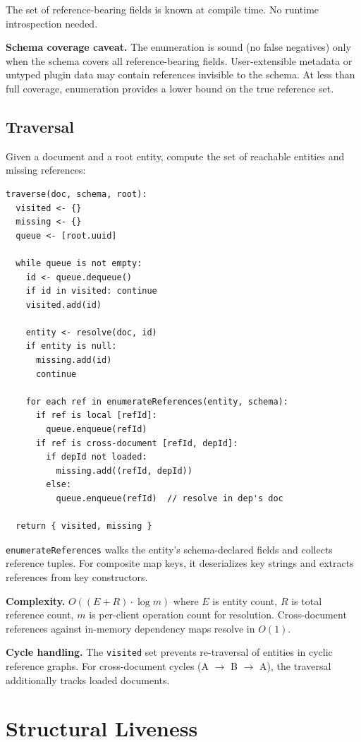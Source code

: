 The set of reference-bearing fields is known at compile time. No runtime introspection needed.

\textbf{Schema coverage caveat.} The enumeration is sound (no false negatives) only when the schema covers all reference-bearing fields. User-extensible metadata or untyped plugin data may contain references invisible to the schema. At less than full coverage, enumeration provides a lower bound on the true reference set.

\subsection{Traversal}

Given a document and a root entity, compute the set of reachable entities and missing references:

\begin{lstlisting}
traverse(doc, schema, root):
  visited <- {}
  missing <- {}
  queue <- [root.uuid]

  while queue is not empty:
    id <- queue.dequeue()
    if id in visited: continue
    visited.add(id)

    entity <- resolve(doc, id)
    if entity is null:
      missing.add(id)
      continue

    for each ref in enumerateReferences(entity, schema):
      if ref is local [refId]:
        queue.enqueue(refId)
      if ref is cross-document [refId, depId]:
        if depId not loaded:
          missing.add((refId, depId))
        else:
          queue.enqueue(refId)  // resolve in dep's doc

  return { visited, missing }
\end{lstlisting}

\texttt{enumerateReferences} walks the entity's schema-declared fields and collects reference tuples. For composite map keys\cite{plexus:keys}, it deserializes key strings and extracts references from key constructors.

\textbf{Complexity.} $O((E + R) \cdot \log m)$ where $E$ is entity count, $R$ is total reference count, $m$ is per-client operation count for resolution. Cross-document references against in-memory dependency maps resolve in $O(1)$.

\textbf{Cycle handling.} The \texttt{visited} set prevents re-traversal of entities in cyclic reference graphs. For cross-document cycles (A $\rightarrow$ B $\rightarrow$ A), the traversal additionally tracks loaded documents.

\section{Structural Liveness}

